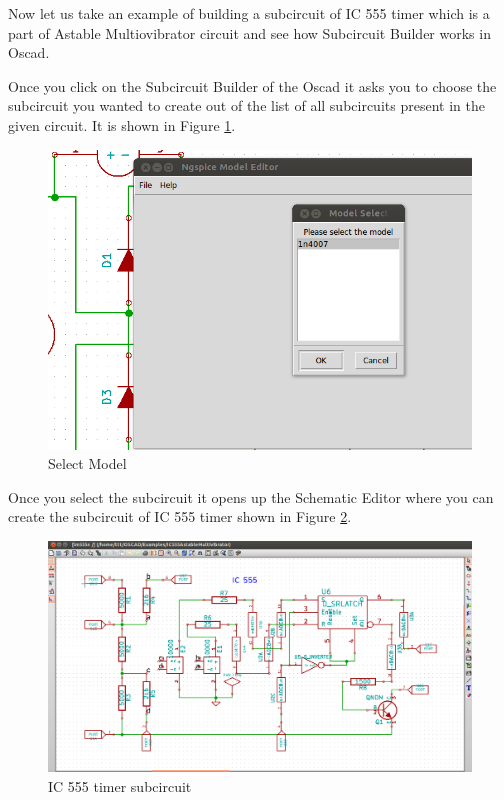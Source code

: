 Now let us take an example of building a subcircuit of IC 555 timer which is a part of Astable Multiovibrator circuit and see how Subcircuit Builder works in Oscad.

Once you click on the Subcircuit Builder of the Oscad it asks you to choose the subcircuit you wanted to create out of the list of all subcircuits present in the given circuit. It is shown in Figure \ref{msel}.


\begin{figure}[h]%
\begin{center}
\includegraphics[width=1\linewidth]{figures/select-model.png}%
\caption{Select Model}
\label{msel}
\end{center}
\end{figure}


Once you select the subcircuit it opens up the Schematic Editor where you can create the subcircuit of IC 555 timer shown in Figure \ref{555}.

\begin{figure}[h]%
\begin{center}
\includegraphics[width=1\linewidth]{figures/subcircuit.png}%
\caption{IC 555 timer subcircuit}
\label{555}
\end{center}
\end{figure}

